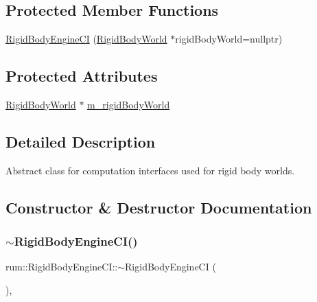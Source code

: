 \subsection*{Protected Member Functions}
\begin{DoxyCompactItemize}
\item 
\mbox{\hyperlink{classrum_1_1_rigid_body_engine_c_i_ad3d2cf7c374c1daf840f693c7467d035}{Rigid\+Body\+Engine\+CI}} (\mbox{\hyperlink{classrum_1_1_rigid_body_world}{Rigid\+Body\+World}} $\ast$rigid\+Body\+World=nullptr)
\end{DoxyCompactItemize}
\subsection*{Protected Attributes}
\begin{DoxyCompactItemize}
\item 
\mbox{\hyperlink{classrum_1_1_rigid_body_world}{Rigid\+Body\+World}} $\ast$ \mbox{\hyperlink{classrum_1_1_rigid_body_engine_c_i_a10e40ea94b4a4f849e5f7e403d9b6966}{m\+\_\+rigid\+Body\+World}}
\end{DoxyCompactItemize}


\subsection{Detailed Description}
Abstract class for computation interfaces used for rigid body worlds. 

\subsection{Constructor \& Destructor Documentation}
\mbox{\label{classrum_1_1_rigid_body_engine_c_i_ad7289e69d0c6261c51736b37abb79797}} 
\subsubsection{\texorpdfstring{$\sim$\+Rigid\+Body\+Engine\+C\+I()}{~RigidBodyEngineCI()}}
{\footnotesize\ttfamily rum\+::\+Rigid\+Body\+Engine\+C\+I\+::$\sim$\+Rigid\+Body\+Engine\+CI (\begin{DoxyParamCaption}{ }\end{DoxyParamCaption})\hspace{0.3cm}{\ttfamily [virtual]}, {\ttfamily [default]}}

